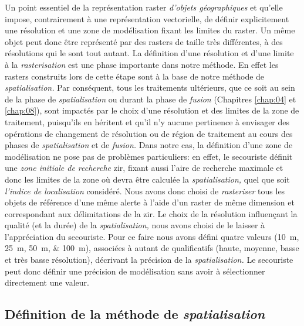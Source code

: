 Un point essentiel de la représentation raster \emph{d'objets
  géographiques} et qu'elle impose, contrairement à une représentation
vectorielle, de définir explicitement une résolution et une zone de
modélisation fixant les limites du raster. Un même objet peut donc
être représenté par des rasters de taille très différentes, à des
résolutions qui le sont tout autant. La définition d'une résolution et
d'une limite à la \emph{rasterisation} est une phase importante dans
notre méthode. En effet les rasters construits lors de cette étape
sont à la base de notre méthode de \emph{spatialisation.} Par
conséquent, tous les traitements ultérieurs, que ce soit au sein de la
phase de \emph{spatialisation} ou durant la phase de \emph{fusion}
(Chapitres \ref{chap:04} et \ref{chap:08}), sont impactés par le choix
d'une résolution et des limites de la zone de traitement, puisqu'ils
en héritent et qu'il n'y aucune pertinence à envisager des opérations
de changement de résolution ou de région de traitement au cours des
phases de \emph{spatialisation} et de \emph{fusion.} Dans notre cas,
la définition d'une zone de modélisation ne pose pas de problèmes
particuliers: en effet, le secouriste définit une \emph{zone initiale
  de recherche} \ac{zir}, fixant aussi l'aire de recherche maximale et
donc les limites de la zone où devra être calculée la
\emph{spatialisation,} quel que soit \emph{l'indice de localisation}
considéré. Nous avons donc choisi de \emph{rasteriser} tous les objets
de référence d'une même alerte à l'aide d'un raster de même dimension
et correspondant aux délimitations de la \ac{zir}. Le choix de la
résolution influençant la qualité (et la durée) de la
\emph{spatialisation,} nous avons choisi de le laisser à
l'appréciation du secouriste. Pour ce faire nous avons défini quatre
valeurs (\SIlist{10;25;50;100}{\meter}), associées à autant de
qualificatifs (haute, moyenne, basse et très basse résolution),
décrivant la précision de la \emph{spatialisation.}  Le secouriste
peut donc définir une précision de modélisation sans avoir à
sélectionner directement une valeur.

\subsection{Définition de la méthode de \emph{spatialisation}}

